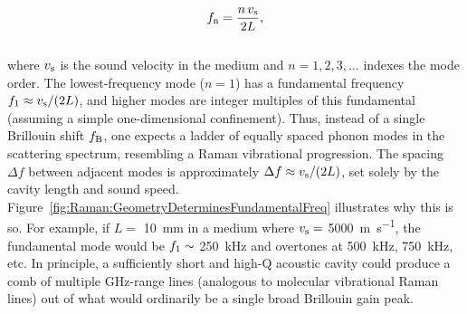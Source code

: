 \begin{equation}
  f_{\rm n} = \frac{n\,v_{\rm s}}{2L},
  \label{eq:Raman:f_R}
\end{equation}
\\
where \(v_{\rm s}\) is the sound velocity in the medium and \(n = 1, 2, 3, \dots\) indexes the mode order. The lowest-frequency mode (\(n = 1\)) has a fundamental frequency \(f_{\rm 1} \approx v_{\rm s}/(2L)\), and higher modes are integer multiples of this fundamental (assuming a simple one-dimensional confinement). Thus, instead of a single Brillouin shift \(f_{\rm B}\), one expects a ladder of equally spaced phonon modes in the scattering spectrum, resembling a Raman vibrational progression. The spacing \(\Delta f\) between adjacent modes is approximately \(\Delta f \approx v_{\rm s}/(2L)\), set solely by the cavity length and sound speed. Figure~\ref{fig:Raman:GeometryDeterminesFundamentalFreq} illustrates why this is so. For example, if \(L =\) \SI{10}{\milli\meter} in a medium where \(v_{\rm s} =\) \SI{5000}{\meter\per\second}, the fundamental mode would be \(f_{\rm 1} \sim\) \SI{250}{\kilo\hertz} and overtones at \SI{500}{\kilo\hertz}, \SI{750}{\kilo\hertz}, etc. In principle, a sufficiently short and high-Q acoustic cavity could produce a comb of multiple \si{\giga\hertz}-range lines (analogous to molecular vibrational Raman lines) out of what would ordinarily be a single broad Brillouin gain peak.

